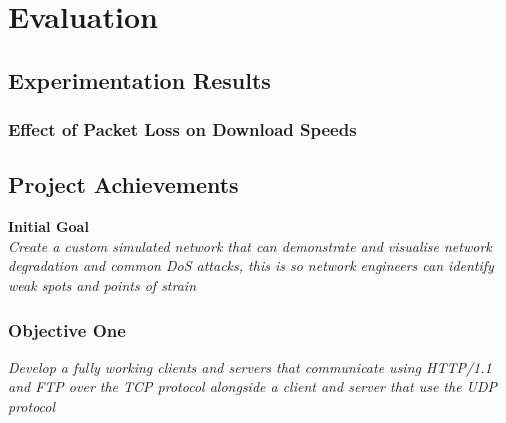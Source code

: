\chapter{Evaluation}


\section{Experimentation Results}

	\subsection{Effect of Packet Loss on Download Speeds}
	


\clearpage
\section{Project Achievements}

{\bf Initial Goal}\\
{\it Create a custom simulated network that can demonstrate and visualise network degradation and common DoS attacks, this is so network engineers can identify weak spots and points of strain}

\newcommand{\chromeUrl}{\url{https://www.google.com/chrome/index.html}}
\newcommand{\firefoxUrl}{\url{https://www.mozilla.org/en-US/firefox/new/}}
\newcommand{\fileZillaUrl}{\url{https://filezilla-project.org/}}

\subsection{Objective One}
{\it Develop a fully working clients and servers that communicate using HTTP/1.1 and FTP over the TCP protocol alongside a client and server that use the UDP protocol}

